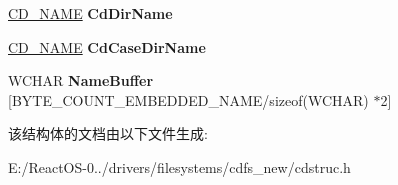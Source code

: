 \begin{DoxyCompactItemize}
\mbox{\label{struct___p_a_t_h___e_n_t_r_y_af74b84ee368341c92b4fe063119102d4}} 
\hyperlink{struct___c_d___n_a_m_e}{C\+D\+\_\+\+N\+A\+ME} {\bfseries Cd\+Dir\+Name}
\item 
\mbox{\label{struct___p_a_t_h___e_n_t_r_y_a704eb4bd183e6cb0c4293860d227c1c2}} 
\hyperlink{struct___c_d___n_a_m_e}{C\+D\+\_\+\+N\+A\+ME} {\bfseries Cd\+Case\+Dir\+Name}
\item 
\mbox{\label{struct___p_a_t_h___e_n_t_r_y_a02475a0aab0dae40c767461714745270}} 
W\+C\+H\+AR {\bfseries Name\+Buffer} \mbox{[}B\+Y\+T\+E\+\_\+\+C\+O\+U\+N\+T\+\_\+\+E\+M\+B\+E\+D\+D\+E\+D\+\_\+\+N\+A\+ME/sizeof(W\+C\+H\+AR) $\ast$2\mbox{]}
\end{DoxyCompactItemize}


该结构体的文档由以下文件生成\+:\begin{DoxyCompactItemize}
\item 
E\+:/\+React\+O\+S-\/0../drivers/filesystems/cdfs\+\_\+new/cdstruc.\+h\end{DoxyCompactItemize}
